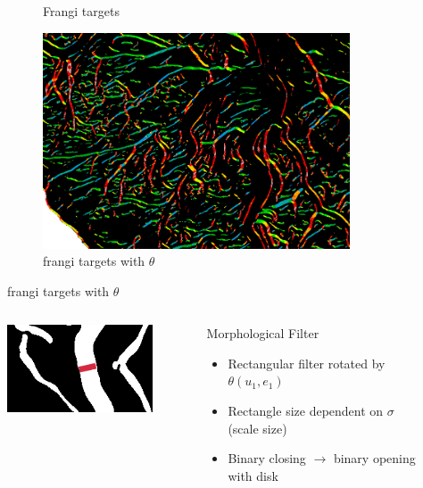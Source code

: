 \documentclass[9pt,notes]{beamer}
\begin{document}
\begin{frame}
\begin{figure}
\begin{subfigure}[b]{0.30\textwidth}
			\caption{Frangi targets}
		\end{subfigure}
		\begin{subfigure}[b]{0.30\textwidth}
			\includegraphics[width=\textwidth]{02pd-inset}
			\caption{frangi targets with $\theta$}
		\end{subfigure}
	\end{figure}
	\begin{columns}[c]
		\begin{column}{0.5\textwidth}
			\begin{figure}
				\includegraphics[height=0.4\textheight]{morphfilter}
			\end{figure}
		\end{column}
		\begin{column}{0.5\textwidth}
			
			\begin{block}{Morphological Filter}
				\begin{itemize}
					\item Rectangular filter rotated by $\theta(u_1,e_1)$
					\item Rectangle size dependent on $\sigma$ (scale size)
					\item Binary closing $\rightarrow$ binary opening with disk
				\end{itemize}
			\end{block}
		\end{column}
	\end{columns}
\end{frame}
\end{document}
